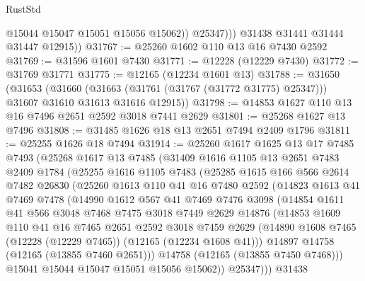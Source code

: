 \begin{lexlean}{RustStd}
\begin{coremodule}
                  @15044
                  @15047
                  @15051
                  @15056
                  @15062))
              @25347)))
        @31438
        @31441
        @31444
        @31447
        @12915))
@31767 := @25260 @1602 @110 @13 @16 @7430 @2592
@31769 := @31596 @1601 @7430
@31771 := @12228 (@12229 @7430)
@31772 := @31769 @31771
@31775 := @12165 (@12234 @1601 @13)
@31788 := @31650
    (@31653
      (@31660 (@31663 (@31761 (@31767 (@31772 @31775) @25347))) @31607 @31610 @31613 @31616 @12915))
@31798 := @14853 @1627 @110 @13 @16 @7496 @2651 @2592 @3018 @7441 @2629
@31801 := @25268 @1627 @13 @7496
@31808 := @31485 @1626 @18 @13 @2651 @7494 @2409 @1796
@31811 := @25255 @1626 @18 @7494
@31914 := @25260
    @1617
    @1625
    @13
    @17
    @7485
    @7493
    (@25268
      @1617
      @13
      @7485
      (@31409
        @1616
        @1105
        @13
        @2651
        @7483
        @2409
        @1784
        (@25255
          @1616
          @1105
          @7483
          (@25285
            @1615
            @166
            @566
            @2614
            @7482
            @26830
            (@25260
              @1613
              @110
              @41
              @16
              @7480
              @2592
              (@14823
                @1613
                @41
                @7469
                @7478
                (@14990
                  @1612
                  @567
                  @41
                  @7469
                  @7476
                  @3098
                  (@14854
                    @1611
                    @41
                    @566
                    @3048
                    @7468
                    @7475
                    @3018
                    @7449
                    @2629
                    @14876
                    (@14853
                      @1609
                      @110
                      @41
                      @16
                      @7465
                      @2651
                      @2592
                      @3018
                      @7459
                      @2629
                      (@14890 @1608 @7465 (@12228 (@12229 @7465)) (@12165 (@12234 @1608 @41)))
                      @14897
                      @14758
                      (@12165 (@13855 @7460 @2651)))
                    @14758
                    (@12165 (@13855 @7450 @7468)))
                  @15041
                  @15044
                  @15047
                  @15051
                  @15056
                  @15062))
              @25347)))
        @31438

\end{coremodule}
\end{lexlean}
